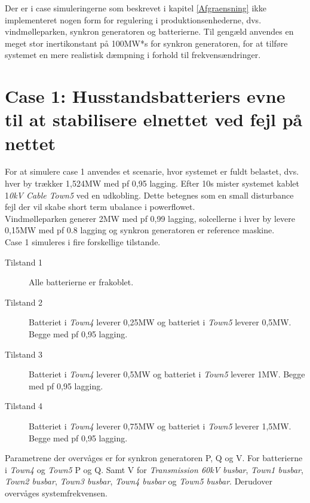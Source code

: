 
\label{Simulering}

Der er i case simuleringerne som beskrevet i kapitel \ref{Afgraensning} ikke implementeret nogen form for regulering i produktionsenhederne, dvs. vindmølleparken, synkron generatoren og batterierne. Til gengæld anvendes en meget stor inertikonstant på 100MW*s for synkron generatoren, for at tilføre systemet en mere realistisk dæmpning i forhold til frekvensændringer.

\section{Case 1: Husstandsbatteriers evne til at stabilisere elnettet ved fejl på nettet}
\label{SimCase1}
For at simulere case 1 anvendes et scenarie, hvor systemet er fuldt belastet, dvs. hver by trækker 1,524MW med pf 0,95 lagging. Efter 10s mister systemet kablet 1\textit{0kV Cable Town5} ved en udkobling. Dette betegnes som en small disturbance fejl der vil skabe short term ubalance i powerflowet.\\
Vindmølleparken generer 2MW med pf 0,99 lagging, solcellerne i hver by levere 0,15MW med pf 0.8 lagging og synkron generatoren er reference maskine.\\
Case 1 simuleres i fire forskellige tilstande.

\begin{description}
	\item[Tilstand 1] Alle batterierne er frakoblet.
	\item[Tilstand 2] Batteriet i \textit{Town4} leverer 0,25MW og batteriet i \textit{Town5} leverer 0,5MW. Begge med pf 0,95 lagging.
	\item[Tilstand 3] Batteriet i \textit{Town4} leverer 0,5MW og batteriet i \textit{Town5} leverer 1MW. Begge med pf 0,95 lagging.
	\item[Tilstand 4] Batteriet i \textit{Town4} leverer 0,75MW og batteriet i \textit{Town5} leverer 1,5MW. Begge med pf 0,95 lagging.
\end{description}

Parametrene der overvåges er for synkron generatoren P, Q og V.
For batterierne i \textit{Town4} og \textit{Town5} P og Q. Samt V for \textit{Transmission 60kV busbar}, \textit{Town1 busbar}, \textit{Town2 busbar}, \textit{Town3 busbar}, \textit{Town4 busbar} og \textit{Town5 busbar}.
Derudover overvåges systemfrekvensen.

